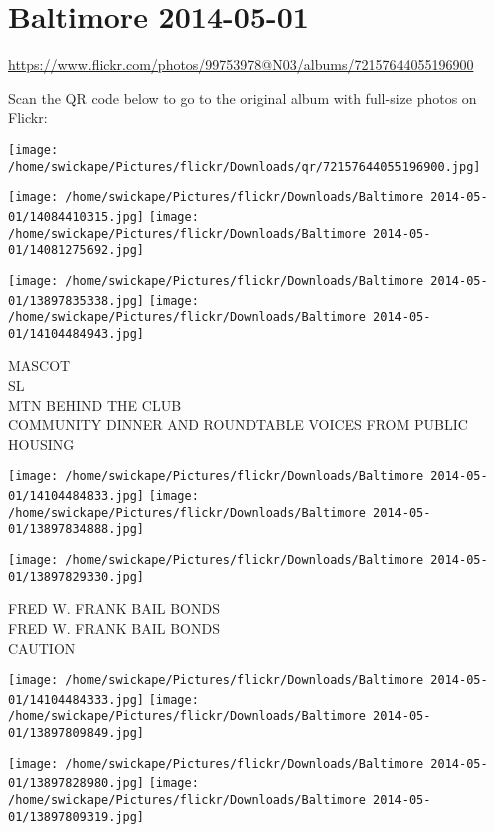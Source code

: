 \documentclass[10pt,letterpaper]{article}
\title{}
\author{}
\date{}
\begin{document}
\section*{Baltimore 2014-05-01}

\url{https://www.flickr.com/photos/99753978@N03/albums/72157644055196900}

Scan the QR code below to go to the original album with full-size photos on Flickr:

\texttt{[image: /home/swickape/Pictures/flickr/Downloads/qr/72157644055196900.jpg]}
\pagebreak

\texttt{[image: /home/swickape/Pictures/flickr/Downloads/Baltimore 2014-05-01/14084410315.jpg]}
\texttt{[image: /home/swickape/Pictures/flickr/Downloads/Baltimore 2014-05-01/14081275692.jpg]}

\texttt{[image: /home/swickape/Pictures/flickr/Downloads/Baltimore 2014-05-01/13897835338.jpg]}
\texttt{[image: /home/swickape/Pictures/flickr/Downloads/Baltimore 2014-05-01/14104484943.jpg]}

MASCOT\\
SL\\
MTN BEHIND THE CLUB\\
COMMUNITY DINNER AND ROUNDTABLE VOICES FROM PUBLIC HOUSING
\pagebreak

\texttt{[image: /home/swickape/Pictures/flickr/Downloads/Baltimore 2014-05-01/14104484833.jpg]}
\texttt{[image: /home/swickape/Pictures/flickr/Downloads/Baltimore 2014-05-01/13897834888.jpg]}

\vspace{0.25in}
\texttt{[image: /home/swickape/Pictures/flickr/Downloads/Baltimore 2014-05-01/13897829330.jpg]}

FRED W. FRANK BAIL BONDS\\
FRED W. FRANK BAIL BONDS\\
CAUTION
\pagebreak

\texttt{[image: /home/swickape/Pictures/flickr/Downloads/Baltimore 2014-05-01/14104484333.jpg]}
\texttt{[image: /home/swickape/Pictures/flickr/Downloads/Baltimore 2014-05-01/13897809849.jpg]}

\texttt{[image: /home/swickape/Pictures/flickr/Downloads/Baltimore 2014-05-01/13897828980.jpg]}
\texttt{[image: /home/swickape/Pictures/flickr/Downloads/Baltimore 2014-05-01/13897809319.jpg]}
\end{document}
